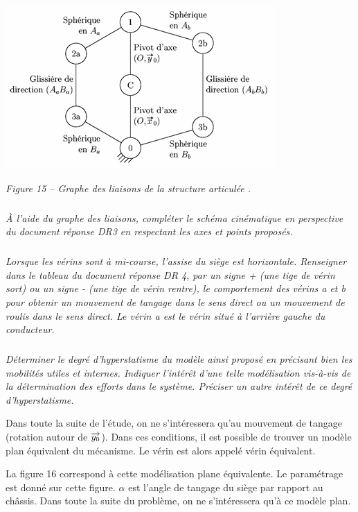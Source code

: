 \documentclass[10pt,fleqn]{article} %
\begin{document}
\begin{center}
\includegraphics[width=.9\linewidth]{images/fig_15}

\textit{Figure 15 -- Graphe des liaisons de la structure articulée .}
\end{center}

\subparagraph{}
\textit{À l'aide du graphe des liaisons, compléter le schéma cinématique en perspective du document réponse DR3 en respectant les axes et points proposés.}

\subparagraph{}
\textit{Lorsque les vérins sont à mi-course, l'assise du siège est horizontale. Renseigner dans le tableau du document réponse DR 4, par un signe + (une tige de vérin sort) ou un signe - (une tige de vérin rentre), le comportement des vérins a et b pour obtenir un mouvement de tangage dans le sens direct ou un mouvement de roulis dans le sens direct. Le vérin a est le vérin situé à l'arrière gauche du conducteur. }

\subparagraph{}
\textit{Déterminer le degré d'hyperstatisme du modèle ainsi proposé en précisant bien les mobilités utiles et internes. Indiquer l'intérêt d'une telle modélisation vis-à-vis de la détermination des efforts dans le système. Préciser un autre intérêt de ce degré d'hyperstatisme.}


Dans toute la suite de l'étude, on ne s'intéressera qu'au mouvement de tangage (rotation autour de $\overrightarrow{y_0}$). Dans ces conditions, il est possible de trouver un modèle plan équivalent du mécanisme. Le vérin est alors appelé vérin équivalent. 

La figure 16 correspond à cette modélisation plane équivalente. Le paramétrage est donné sur cette figure. $\alpha$ est l'angle de tangage du siège par rapport au châssis. Dans toute la suite du problème, on ne s'intéressera qu'à ce modèle plan. 
\end{document}
